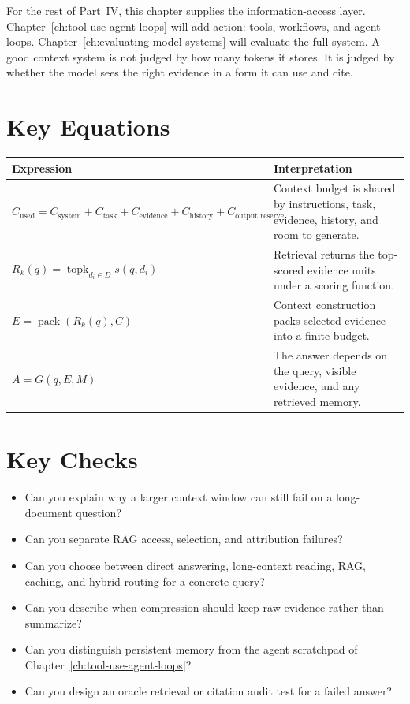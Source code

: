 For the rest of Part~IV, this chapter supplies the information-access layer. Chapter~\ref{ch:tool-use-agent-loops} will add action: tools, workflows, and agent loops. Chapter~\ref{ch:evaluating-model-systems} will evaluate the full system. A good context system is not judged by how many tokens it stores. It is judged by whether the model sees the right evidence in a form it can use and cite.

\section*{Key Equations}

\begin{center}
\begin{tabularx}{\textwidth}{@{}lX@{}}
\toprule
\textbf{Expression} & \textbf{Interpretation} \\
\midrule
$C_{\text{used}} = C_{\text{system}} + C_{\text{task}} + C_{\text{evidence}} + C_{\text{history}} + C_{\text{output reserve}}$ & Context budget is shared by instructions, task, evidence, history, and room to generate. \\
$R_k(q) = \operatorname{topk}_{d_i \in D} s(q,d_i)$ & Retrieval returns the top-scored evidence units under a scoring function. \\
$E = \operatorname{pack}(R_k(q), C)$ & Context construction packs selected evidence into a finite budget. \\
$A = G(q,E,M)$ & The answer depends on the query, visible evidence, and any retrieved memory. \\
\bottomrule
\end{tabularx}
\end{center}

\section*{Key Checks}

\begin{itemize}
  \item Can you explain why a larger context window can still fail on a long-document question?
  \item Can you separate RAG access, selection, and attribution failures?
  \item Can you choose between direct answering, long-context reading, RAG, caching, and hybrid routing for a concrete query?
  \item Can you describe when compression should keep raw evidence rather than summarize?
  \item Can you distinguish persistent memory from the agent scratchpad of Chapter~\ref{ch:tool-use-agent-loops}?
  \item Can you design an oracle retrieval or citation audit test for a failed answer?
\end{itemize}

